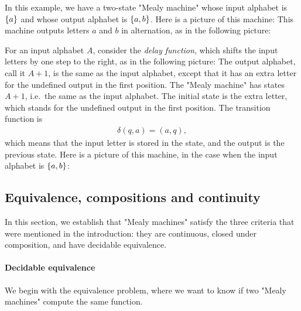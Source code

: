 \begin{myexample}\label{ex:alternating-a-b} In this example, we have a two-state "Mealy machine" whose input alphabet is $\{a\}$ and whose output alphabet is $\{a,b\}$. Here is a picture of this machine:
    This machine outputs letters $a$ and $b$ in alternation, as in the following picture:
\end{myexample}


\begin{myexample}[Delay]\label{ex:delay}
    For an input alphabet $A$, consider the \emph{delay function}, which shifts the input letters by one step to the right, as in the following picture: 
    The output alphabet, call it $A+1$,  is the same as the input alphabet, except that it has an extra letter for the undefined output in the first position. The "Mealy machine" has states $A+1$, i.e.~the same as the input alphabet. The initial state is the extra letter, which stands for the undefined output in the first position. The transition function  is 
    \begin{align*}
    \delta(q,a)  = (a,q),
    \end{align*}
which means that  the input letter is stored in the state, and the output is the previous state. Here is a picture of this machine, in the case when the input alphabet is $\{a,b\}$:
\end{myexample}

\subsection{Equivalence, compositions and continuity}
\label{sec:properties-mealy}
In this section, we establish that "Mealy machines" satisfy the three criteria that were mentioned in the introduction: they are continuous, closed under composition, and have decidable equivalence.

\paragraph*{Decidable equivalence} We begin with the equivalence problem, where we want to know if two "Mealy machines" compute the same function.

